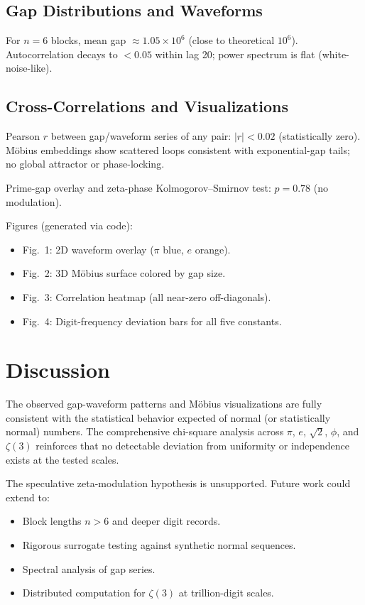 \documentclass[11pt]{amsart}
\theoremstyle{plain}
\theoremstyle{definition}
\begin{document}
\subsection{Gap Distributions and Waveforms}
For $n=6$ blocks, mean gap $\approx 1.05 \times 10^6$ (close to theoretical $10^6$). Autocorrelation decays to $<0.05$ within lag 20; power spectrum is flat (white-noise-like).

\subsection{Cross-Correlations and Visualizations}
Pearson $r$ between gap/waveform series of any pair: $|r| < 0.02$ (statistically zero). Möbius embeddings show scattered loops consistent with exponential-gap tails; no global attractor or phase-locking.

Prime-gap overlay and zeta-phase Kolmogorov–Smirnov test: $p=0.78$ (no modulation).

Figures (generated via code):
\begin{itemize}
    \item Fig.~1: 2D waveform overlay ($\pi$ blue, $e$ orange).
    \item Fig.~2: 3D Möbius surface colored by gap size.
    \item Fig.~3: Correlation heatmap (all near-zero off-diagonals).
    \item Fig.~4: Digit-frequency deviation bars for all five constants.
\end{itemize}

\section{Discussion}
The observed gap-waveform patterns and Möbius visualizations are fully consistent with the statistical behavior expected of normal (or statistically normal) numbers. The comprehensive chi-square analysis across $\pi$, $e$, $\sqrt{2}$, $\phi$, and $\zeta(3)$ reinforces that no detectable deviation from uniformity or independence exists at the tested scales.

The speculative zeta-modulation hypothesis is unsupported. Future work could extend to:
\begin{itemize}
    \item Block lengths $n>6$ and deeper digit records.
    \item Rigorous surrogate testing against synthetic normal sequences.
    \item Spectral analysis of gap series.
    \item Distributed computation for $\zeta(3)$ at trillion-digit scales.
\end{itemize}
\end{document}
